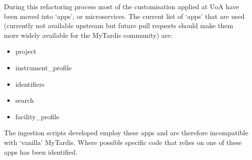 \documentclass[letterpaper,10pt,english]{sphinxmanual}
\begin{document}
\sphinxAtStartPar
During this refactoring process most of the customisation applied at UoA have been moved into ‘apps’, or micro\sphinxhyphen{}services. The current list of ‘apps’ that are used (currently not available upstream but future pull requests should make them more widely available for the MyTardis community) are:
\begin{itemize}
\item {} 
\sphinxAtStartPar
project

\item {} 
\sphinxAtStartPar
instrument\_profile

\item {} 
\sphinxAtStartPar
identifiers

\item {} 
\sphinxAtStartPar
search

\item {} 
\sphinxAtStartPar
facility\_profile

\end{itemize}

\sphinxAtStartPar
The ingestion scripts developed employ these apps and are therefore incompatible with ‘vanilla’ MyTardis. Where possible specific code that relies on one of these apps has been identified.
\end{document}

